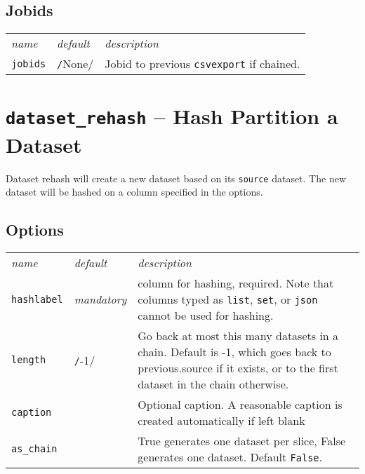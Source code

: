 \subsection*{Jobids}
\begin{tabular}{ p{3.2cm} p{1.8cm} p{10cm}}\hline
  \textsl{name} & \textsl{default} & \textsl{description}\\[2ex]
  \texttt{jobids} & \texttt/None/ & Jobid to
  previous \texttt{csvexport} if chained.\\[1ex]
  \hline
\end{tabular}

















\clearpage
\section{\texttt{dataset\_rehash} -- Hash Partition a Dataset}

Dataset rehash will create a new dataset based on its \texttt{source}
dataset.  The new dataset will be hashed on a column specified in the
options.

\subsection*{Options}
\begin{tabular}{ p{3.2cm} p{1.8cm} p{10cm}}\hline
  \textsl{name} & \textsl{default} & \textsl{description}\\[2ex]

  \texttt{hashlabel} & \textsl{mandatory} & column for hashing,
  required.  Note that columns typed as \texttt{list}, \texttt{set},
  or \texttt{json} cannot be used for hashing.\\[1ex]

  \texttt{length} & \texttt/-1/ & Go back at most this
  many datasets in a chain.  Default is -1, which goes back to
  previous.source if it exists, or to the first dataset in the chain
  otherwise.\\[1ex]

  \texttt{caption} & & Optional caption.  A
  reasonable caption is created automatically if left blank\\[1ex]
  \texttt{as\_chain} & & True generates one dataset per slice, False
  generates one dataset.  Default \texttt{False}.\\[1ex]
  \hline
\end{tabular}


